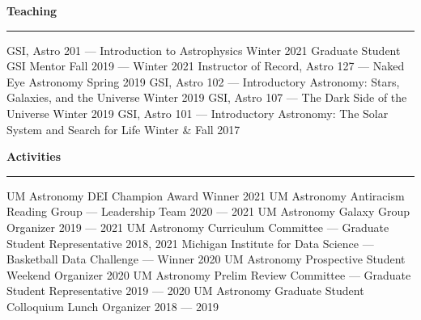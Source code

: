 \documentclass[10pt]{article}
\newcommand{\header}[1]{\vspace{2em}\par \textbf{\large #1}\strut\hrule\vspace{0em}}
\newcommand{\actionHeader}[2]{\textbf{#1 \hfill #2}}
\newcommand{\justifiedItemDate}[2]{\newline\null#1 \hfill #2}
\newcommand{\justifiedItemDateFirst}[2]{#1 \hfill #2}
\newcommand{\indentedItem}[1]{\newline\null\qquad #1}
\begin{document}
\header{Teaching} 
\justifiedItemDateFirst{GSI, Astro 201 --- Introduction to Astrophysics}{Winter 2021}
\justifiedItemDate{Graduate Student GSI Mentor}{Fall 2019 --- Winter 2021}
\justifiedItemDate{Instructor of Record, Astro 127 --- Naked Eye Astronomy}{Spring 2019}
\justifiedItemDate{GSI, Astro 102 --- Introductory Astronomy: Stars, Galaxies, and the Universe}{Winter 2019}
\justifiedItemDate{GSI, Astro 107 --- The Dark Side of the Universe}{Winter 2019}
\justifiedItemDate{GSI, Astro 101 --- Introductory Astronomy: The Solar System and Search for Life}{Winter \& Fall 2017}







 \pagebreak

\header{Activities}
\justifiedItemDateFirst{UM Astronomy DEI Champion Award Winner}{2021}
\justifiedItemDate{UM Astronomy Antiracism Reading Group --- Leadership Team}{2020 --- 2021}
\justifiedItemDate{UM Astronomy Galaxy Group Organizer}{2019 --- 2021}
\justifiedItemDate{UM Astronomy Curriculum Committee --- Graduate Student Representative}{2018, 2021}
\justifiedItemDate{Michigan Institute for Data Science --- Basketball Data Challenge --- Winner}{2020}
\justifiedItemDate{UM Astronomy Prospective Student Weekend Organizer}{2020}
\justifiedItemDate{UM Astronomy Prelim Review Committee --- Graduate Student Representative}{2019 --- 2020}
\justifiedItemDate{UM Astronomy Graduate Student Colloquium Lunch Organizer}{2018 --- 2019}
\end{document}
